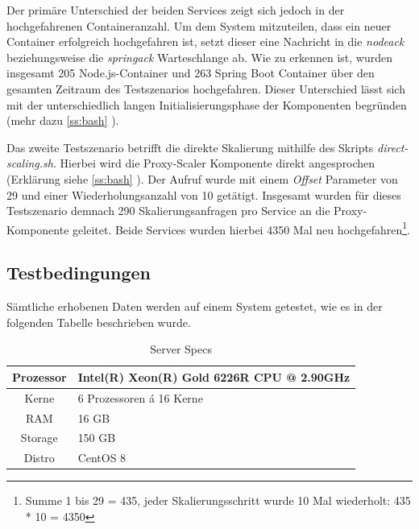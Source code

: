 Der primäre Unterschied der beiden Services zeigt sich jedoch in der hochgefahrenen Containeranzahl. Um dem System mitzuteilen, dass ein neuer Container erfolgreich hochgefahren ist, setzt dieser eine Nachricht in die \emph{nodeack} beziehungsweise die \emph{springack} Warteschlange ab. Wie zu erkennen ist, wurden insgesamt 205 Node.js-Container und 263 Spring Boot Container über den gesamten Zeitraum des Testszenarios hochgefahren. Dieser Unterschied lässt sich mit der unterschiedlich langen Initialisierungsphase der Komponenten begründen (mehr dazu \ref{ss:bash} ).

Das zweite Testszenario betrifft die direkte Skalierung mithilfe des Skripts \emph{direct-scaling.sh}. Hierbei wird die Proxy-Scaler Komponente direkt angesprochen (Erklärung siehe \ref{ss:bash} ). Der Aufruf wurde mit einem \emph{Offset} Parameter von 29 und einer Wiederholungsanzahl von 10 getätigt. Insgesamt wurden für dieses Testszenario demnach 290 Skalierungsanfragen pro Service an die Proxy-Komponente geleitet. Beide Services wurden hierbei 4350 Mal neu hochgefahren\footnote{Summe 1 bis 29 = 435, jeder Skalierungsschritt wurde 10 Mal wiederholt: 435 * 10 = 4350}.

\subsection{Testbedingungen}

Sämtliche erhobenen Daten werden auf einem System getestet, wie es in der folgenden Tabelle beschrieben wurde. 

\renewcommand\theadalign{bc}
\renewcommand\theadfont{\bfseries}
\renewcommand\theadgape{\Gape[4pt]}
\renewcommand\cellgape{\Gape[4pt]}

\begin{table}[ht!]
  \centering
  \bigskip
  \begin{tabular}{ c l }
    \toprule
    Prozessor & Intel(R) Xeon(R) Gold 6226R CPU @ 2.90GHz \\
    \midrule
    Kerne & 6 Prozessoren á 16 Kerne \\
    \midrule
    RAM & 16 GB \\
    \midrule
    Storage & 150 GB \\
    \midrule
    Distro & CentOS 8\\
    \bottomrule
  \end{tabular}
  \caption{Server Specs}
  \label{tab:serverSpecs}
\end{table}
